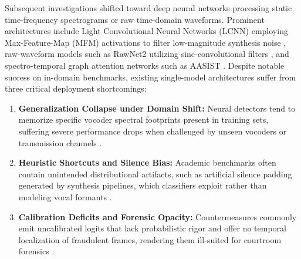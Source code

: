 \documentclass[conference]{IEEEtran}
\begin{document}
Subsequent investigations shifted toward deep neural networks processing static time-frequency spectrograms or raw time-domain waveforms. Prominent architectures include Light Convolutional Neural Networks (LCNN) employing Max-Feature-Map (MFM) activations to filter low-magnitude synthesis noise \cite{lavrentyeva2019stc}, raw-waveform models such as RawNet2 utilizing sinc-convolutional filters \cite{tak2021rawnet2}, and spectro-temporal graph attention networks such as AASIST \cite{jung2022aasist}. Despite notable success on in-domain benchmarks, existing single-model architectures suffer from three critical deployment shortcomings:
\begin{enumerate}
    \item \textbf{Generalization Collapse under Domain Shift:} Neural detectors tend to memorize specific vocoder spectral footprints present in training sets, suffering severe performance drops when challenged by unseen vocoders or transmission channels \cite{muller2022does}.
    \item \textbf{Heuristic Shortcuts and Silence Bias:} Academic benchmarks often contain unintended distributional artifacts, such as artificial silence padding generated by synthesis pipelines, which classifiers exploit rather than modeling vocal formants \cite{frank2021wavefake}.
    \item \textbf{Calibration Deficits and Forensic Opacity:} Countermeasures commonly emit uncalibrated logits that lack probabilistic rigor and offer no temporal localization of fraudulent frames, rendering them ill-suited for courtroom forensics \cite{platt1999probabilistic}.
\end{enumerate}
\end{document}
